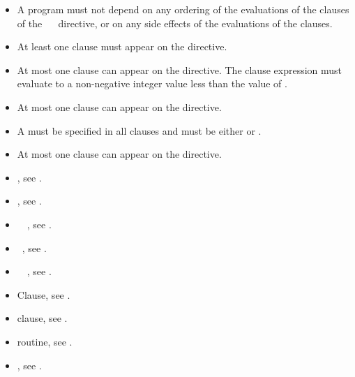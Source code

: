 \restrictions
\begin{itemize}
\item A program must not depend on any ordering of the evaluations of the clauses of the ~~ directive, or on any side effects of the evaluations of the clauses.
\item At least one  clause must appear on the directive.

\item At most one  clause can appear on the
  directive. The  clause expression must evaluate to a
  non-negative integer value less than the value of
  .

\item At most one  clause can appear on the directive.
\item A  must be specified in all  clauses and must be either  or .
\item At most one  clause can appear on the directive.
\end{itemize}

\crossreferences
\begin{itemize}
\item {}, see .

\item {}, see .

\item {}~~,
      see .

\item {}~, see .

\item {}~~,
      see .

\item {} Clause, see .

\item {} clause, see .

\item {} routine, see .

\item {}, see
.

\end{itemize}





